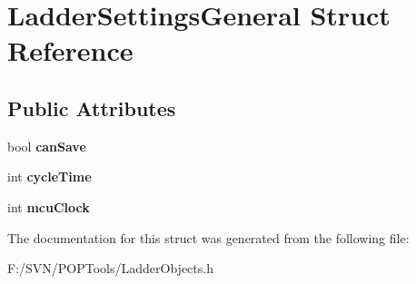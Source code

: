 \hypertarget{struct_ladder_settings_general}{\section{Ladder\-Settings\-General Struct Reference}
\label{struct_ladder_settings_general}
}
\subsection*{Public Attributes}
\begin{DoxyCompactItemize}
\item 
\hypertarget{struct_ladder_settings_general_acbeb095baf6bef087b3a659120c912b7}{bool {\bfseries can\-Save}}\label{struct_ladder_settings_general_acbeb095baf6bef087b3a659120c912b7}

\item 
\hypertarget{struct_ladder_settings_general_ac53a99d03bdfd0034866654f497ba20b}{int {\bfseries cycle\-Time}}\label{struct_ladder_settings_general_ac53a99d03bdfd0034866654f497ba20b}

\item 
\hypertarget{struct_ladder_settings_general_a95e1ff81138a1f117150697e82a78b2e}{int {\bfseries mcu\-Clock}}\label{struct_ladder_settings_general_a95e1ff81138a1f117150697e82a78b2e}

\end{DoxyCompactItemize}


The documentation for this struct was generated from the following file\-:\begin{DoxyCompactItemize}
\item 
F\-:/\-S\-V\-N/\-P\-O\-P\-Tools/Ladder\-Objects.\-h\end{DoxyCompactItemize}
